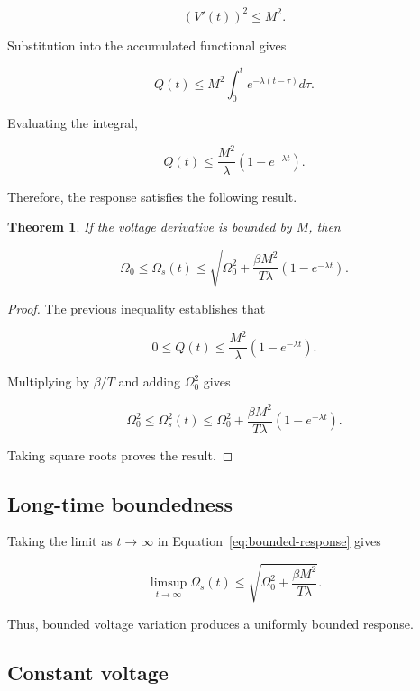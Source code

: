 \documentclass[12pt]{article}
\newtheorem{theorem}{Theorem}[section]
\theoremstyle{definition}
\theoremstyle{remark}
\begin{document}
\[
(V'(t))^2\leq M^2.
\]

Substitution into the accumulated functional gives

\[
Q(t)\leq
M^2\int_0^t e^{-\lambda(t-\tau)}d\tau.
\]

Evaluating the integral,

\[
Q(t)\leq
\frac{M^2}{\lambda}
\left(1-e^{-\lambda t}\right).
\]

Therefore, the response satisfies the following
result.

\begin{theorem}

If the voltage derivative is bounded by \(M\),
then

\begin{equation}
\Omega_0
\leq\Omega_s(t)
\leq
\sqrt{
\Omega_0^2+
\frac{\beta M^2}{T\lambda}
\left(1-e^{-\lambda t}\right)
}.
\label{eq:bounded-response}
\end{equation}

\end{theorem}

\begin{proof}

The previous inequality establishes that

\[
0\leq Q(t)\leq
\frac{M^2}{\lambda}
\left(1-e^{-\lambda t}\right).
\]

Multiplying by \(\beta/T\) and adding
\(\Omega_0^2\) gives

\[
\Omega_0^2
\leq
\Omega_s^2(t)
\leq
\Omega_0^2+
\frac{\beta M^2}{T\lambda}
\left(1-e^{-\lambda t}\right).
\]

Taking square roots proves the result.

\end{proof}

\subsection{Long-time boundedness}

Taking the limit as \(t\to\infty\) in
Equation~\eqref{eq:bounded-response} gives

\begin{equation}
\limsup_{t\to\infty}\Omega_s(t)
\leq
\sqrt{
\Omega_0^2+
\frac{\beta M^2}{T\lambda}
}.
\label{eq:long-bound}
\end{equation}

Thus, bounded voltage variation produces
a uniformly bounded response.

\subsection{Constant voltage}
\end{document}
